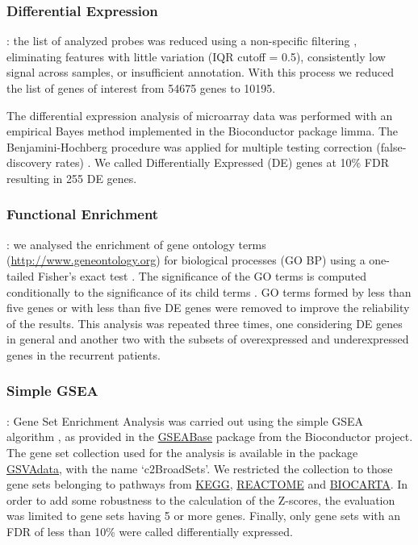 \documentclass[9pt,twocolumn,twoside]{gsajnl}
\begin{document}
\subsubsection*{Differential Expression}: the list of analyzed probes was reduced using a non-specific filtering \citep{Bourgon2010}, eliminating features with little variation (IQR cutoff = 0.5), consistently low signal across samples, or insufficient annotation. With this process we reduced the list of genes of interest from 54675 genes to 10195.

The differential expression analysis of microarray data was performed with an empirical Bayes method \citep{Smyth2004} implemented in the Bioconductor package limma. The Benjamini-Hochberg procedure was applied for multiple testing correction (false-discovery rates) \citep{Benjamini1995}. We called Differentially Expressed (DE) genes at 10\% FDR resulting in 255 DE genes.

\subsubsection*{Functional Enrichment}: we analysed the enrichment of gene ontology terms (\url{http://www.geneontology.org}) for biological processes (GO BP) using a one-tailed Fisher's exact test \citep{Fisher1922}. The significance of the GO terms is computed conditionally to the significance of its child terms \citep{Alexa2006}. GO terms formed by less than five genes or with less than five DE genes were removed to improve the reliability of the results. This analysis was repeated three times, one considering DE genes in general and another two with the subsets of overexpressed and underexpressed genes in the recurrent patients.

\subsubsection*{Simple GSEA}: Gene Set Enrichment Analysis \citep{Subramanian2005} was carried out using the simple GSEA algorithm \citep{Irizarry2009}, as provided in the \href{http://www.bioconductor.org/packages/release/bioc/html/GSEABase.html}{GSEABase} package from the Bioconductor project. The gene set collection used for the analysis is available in the package \href{http://www.bioconductor.org/packages/release/data/experiment/html/GSVAdata.html}{GSVAdata}, with the name `c2BroadSets'. We restricted the collection to those gene sets belonging to pathways from \href{http://www.genome.jp/kegg/pathway.html}{KEGG}, \href{http://www.reactome.org/}{REACTOME} and \href{http://www.biocarta.com/}{BIOCARTA}. In order to add some robustness to the calculation of the Z-scores, the evaluation was limited to gene sets having 5 or more genes. Finally, only gene sets with an FDR of less than 10\% were called differentially expressed.
\end{document}

